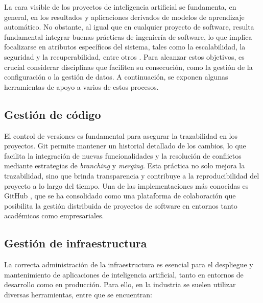 La cara visible de los proyectos de inteligencia artificial se fundamenta, en general, en los resultados y aplicaciones derivados de modelos de aprendizaje automático. No obstante, al igual que en cualquier proyecto de software, resulta fundamental integrar buenas prácticas de ingeniería de software, lo que implica focalizarse en atributos específicos del sistema, tales como la escalabilidad, la seguridad y la recuperabilidad, entre otros \citep{sommerville_software_2015}. Para alcanzar estos objetivos, es crucial considerar disciplinas que faciliten su consecución, como la gestión de la configuración o la gestión de datos. A continuación, se exponen algunas herramientas de apoyo a varios de estos procesos.

\subsection{Gestión de código}

El control de versiones es fundamental para asegurar la trazabilidad en los proyectos. Git permite mantener un historial detallado de los cambios, lo que facilita la integración de nuevas funcionalidades y la resolución de conflictos mediante estrategias de \textit{branching} y \textit{merging}. Esta práctica no solo mejora la trazabilidad, sino que brinda transparencia y contribuye a la reproducibilidad del proyecto a lo largo del tiempo. Una de las implementaciones más conocidas es GitHub \citep{github_build_nodate}, que se ha consolidado como una plataforma de colaboración que posibilita la gestión distribuida de proyectos de software en entornos tanto académicos como empresariales.

\subsection{Gestión de infraestructura}
\label{sec:gestionDeinfraestructura}

La correcta administración de la infraestructura es esencial para el despliegue y mantenimiento de aplicaciones de inteligencia artificial, tanto en entornos de desarrollo como en producción. Para ello, en la industria se suelen utilizar diversas herramientas, entre que se encuentran:


